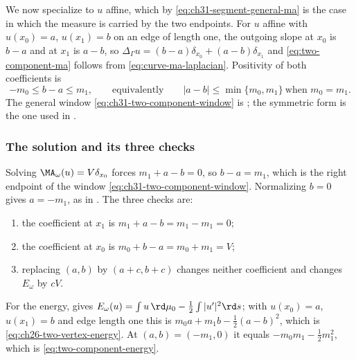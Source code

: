 We now specialize to \(u\) affine, which by
\eqref{eq:ch31-segment-general-ma} is the case in which the measure is
carried by the two endpoints.  For \(u\) affine with
\(u(x_0)=a\), \(u(x_1)=b\) on an edge of length one,
the outgoing slope at \(x_0\) is \(b-a\) and at \(x_1\) is \(a-b\), so
\(\Delta_\Gamma u=(b-a)\delta_{x_0}+(a-b)\delta_{x_1}\) and
\eqref{eq:two-component-ma} follows from
\eqref{eq:curve-ma-laplacian}.  Positivity of both coefficients is
\begin{equation}
\label{eq:ch31-two-component-window}
 -m_0\leq b-a\leq m_1,
 \qquad\text{equivalently}\qquad
 |a-b|\leq\min\{m_0,m_1\}\ \text{when }m_0=m_1 .
\end{equation}
The general window \eqref{eq:ch31-two-component-window} is
; the symmetric form is the one used in
.

\subsubsection*{The solution and its three checks}

Solving \(\MA_\omega(u)=V\delta_{x_0}\) forces \(m_1+a-b=0\), so
\(b-a=m_1\), which is the right endpoint of the window
\eqref{eq:ch31-two-component-window}.  Normalizing \(b=0\) gives
\(a=-m_1\), as in .  The three checks are:
\begin{enumerate}
\item the coefficient at \(x_1\) is \(m_1+a-b=m_1-m_1=0\);
\item the coefficient at \(x_0\) is \(m_0+b-a=m_0+m_1=V\);
\item replacing \((a,b)\) by \((a+c,b+c)\) changes neither coefficient and
 changes \(E_\omega\) by \(cV\).
\end{enumerate}
For the energy,  gives
\(E_\omega(u)=\int u\,\rd\mu_0-\tfrac12\int|u'|^2\rd s\); with
\(u(x_0)=a\), \(u(x_1)=b\) and edge length one this is
\(m_0a+m_1b-\tfrac12(a-b)^2\), which is
\eqref{eq:ch26-two-vertex-energy}.  At \((a,b)=(-m_1,0)\) it equals
\(-m_0m_1-\tfrac12m_1^2\), which is \eqref{eq:two-component-energy}.

